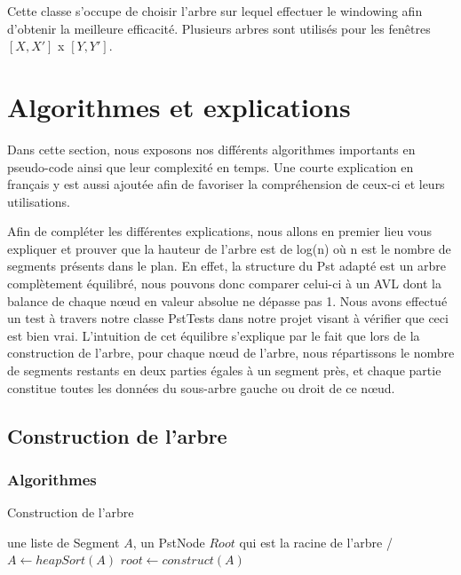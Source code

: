 \documentclass[10pt,a4paper]{article}
\begin{document}
Cette classe s'occupe de choisir l'arbre sur lequel effectuer le windowing afin d'obtenir la meilleure efficacité. Plusieurs arbres sont utilisés pour les fenêtres $[X, X']$ x $[Y, Y']$.

\newpage
\section{Algorithmes et explications}
Dans cette section, nous exposons nos différents algorithmes importants en pseudo-code ainsi que leur complexité en temps. Une courte explication en français y est aussi ajoutée afin de favoriser la compréhension de ceux-ci et leurs utilisations.


Afin de compléter les différentes explications, nous allons en premier lieu vous expliquer et prouver que la hauteur de l'arbre est de log(n) où n est le nombre de segments présents dans le plan. En effet, la structure du Pst adapté est un arbre complètement équilibré, nous pouvons donc comparer celui-ci à un AVL dont la balance de chaque nœud en valeur absolue ne dépasse pas 1.
Nous avons effectué un test à travers notre classe PstTests dans notre projet visant à vérifier que ceci est bien vrai. L'intuition de cet équilibre s'explique par le fait que lors de la construction de l’arbre, pour chaque nœud de l'arbre, nous répartissons le nombre de segments restants en deux parties égales à un segment près, et chaque partie constitue toutes les données du sous-arbre gauche ou droit de ce nœud.
\subsection{Construction de l'arbre}

\subsubsection{Algorithmes}

\begin{algorithm}
\caption{Construction de l'arbre}
\begin{algorithmic}[1]
\REQUIRE une liste de Segment $A$, un PstNode $Root$ qui est la racine de l'arbre 
\ENSURE /
\STATE $A \leftarrow heapSort(A)$
\STATE $root \leftarrow construct(A) $
\end{algorithmic}
\end{algorithm}
\end{document}
